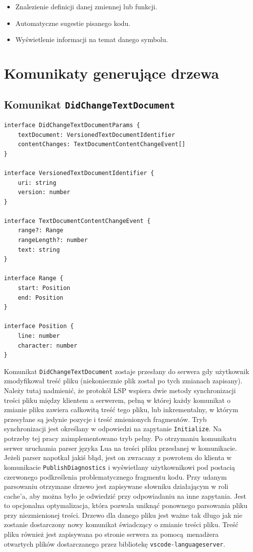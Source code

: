 \begin{itemize}
    \item Znalezienie definicji danej zmiennej lub funkcji.
    \item Automatyczne sugestie pisanego kodu.
    \item Wyświetlenie informacji na temat danego symbolu.
\end{itemize}

\section{Komunikaty generujące drzewa}
\subsection{Komunikat \texttt{DidChangeTextDocument}}
\begin{lstlisting}[title=Struktura argumentu komunikatu]
interface DidChangeTextDocumentParams {
    textDocument: VersionedTextDocumentIdentifier
    contentChanges: TextDocumentContentChangeEvent[]
}

interface VersionedTextDocumentIdentifier {
    uri: string
    version: number
}

interface TextDocumentContentChangeEvent {
    range?: Range
    rangeLength?: number
    text: string
}

interface Range {
    start: Position
    end: Position
}

interface Position {
    line: number
    character: number
}
\end{lstlisting}

Komunikat \texttt{DidChangeTextDocument} zostaje przesłany do serwera gdy użytkownik zmodyfikował treść pliku (niekoniecznie plik został po tych zmianach zapisany). Należy tutaj nadmienić, że protokół LSP wspiera dwie metody synchronizacji treści pliku między klientem a serwerem, pełną w której każdy komunikat o zmianie pliku zawiera całkowitą treść tego pliku, lub inkrementalny, w którym przesyłane są jedynie pozycje i treść zmienionych fragmentów. Tryb synchronizacji jest określany w odpowiedzi na zapytanie \texttt{Initialize}. Na potrzeby tej pracy zaimplementowano tryb pełny. Po otrzymaniu komunikatu serwer uruchamia parser języka Lua na treści pliku przesłanej w komunikacie. Jeżeli parser napotkał jakiś błąd, jest on zwracany z powrotem do klienta w komunikacie \texttt{PublishDiagnostics} i wyświetlany użytkownikowi pod postacią czerwonego podkreślenia problematycznego fragmentu kodu. Przy udanym parsowaniu otrzymane drzewo jest zapisywane słowniku działającym w roli cache'a, aby można było je odwiedzić przy odpowiadaniu na inne zapytania. Jest to opcjonalna optymalizacja, która pozwala uniknąć ponownego parsowania pliku przy niezmienionej treści. Drzewo dla danego pliku jest ważne tak długo jak nie zostanie dostarczony nowy komunikat świadczący o zmianie treści pliku. Treść pliku również jest zapisywana po stronie serwera za pomocą menadżera otwartych plików dostarczanego przez bibliotekę \texttt{vscode-languageserver}.

